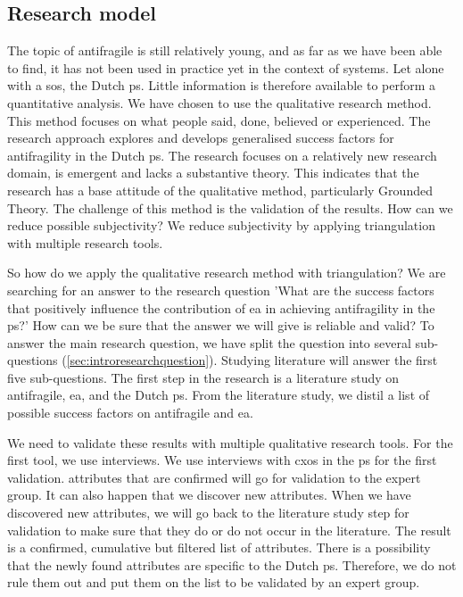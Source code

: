 \subsection{Research model}
\label{sec:researchmodel}
The topic of \gls{antifragile} is still relatively young, and as far as we have been able to find, it has not been used in practice yet in the context of systems. Let alone with a \gls{sos}, the Dutch \gls{ps}. Little information is therefore available to perform a quantitative analysis. We have chosen to use the qualitative research method. This method focuses on what people said, done, believed or experienced. The research approach explores and develops generalised success factors for \gls{antifragility} in the Dutch \gls{ps}. The research focuses on a relatively new research domain, is emergent and lacks a substantive theory. This indicates that the research has a base attitude of the qualitative method, particularly Grounded Theory. The challenge of this method is the validation of the results. How can we reduce possible subjectivity?  We reduce subjectivity by applying triangulation with multiple research tools.

So how do we apply the qualitative research method with triangulation? We are searching for an answer to the research question 'What are the success factors that positively influence the contribution of \gls{ea} in achieving \gls{antifragility} in the \gls{ps}?' How can we be sure that the answer we will give is reliable and valid? To answer the main research question, we have split the question into several sub-questions (\cref{sec:introresearchquestion}). Studying literature will answer the first five sub-questions. The first step in the research is a literature study on \gls{antifragile}, \gls{ea}, and the Dutch \gls{ps}. From the literature study, we distil a list of possible success factors on \gls{antifragile} and \gls{ea}.

We need to validate these results with multiple qualitative research tools. For the first tool, we use interviews. We use interviews with \glspl{cxo} in the \gls{ps} for the first validation. \Glspl{attribute} that are confirmed will go for validation to the expert group. It can also happen that we discover new \glspl{attribute}. When we have discovered new \glspl{attribute}, we will go back to the literature study step for validation to make sure that they do or do not occur in the literature. The result is a confirmed, cumulative but filtered list of \glspl{attribute}. There is a possibility that the newly found \glspl{attribute} are specific to the Dutch \gls{ps}. Therefore, we do not rule them out and put them on the list to be validated by an expert group.

